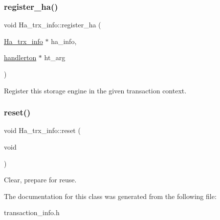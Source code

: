 \subsubsection{\texorpdfstring{register\+\_\+ha()}{register\_ha()}}
{\footnotesize\ttfamily void Ha\+\_\+trx\+\_\+info\+::register\+\_\+ha (\begin{DoxyParamCaption}\item[{\mbox{\hyperlink{classHa__trx__info}{Ha\+\_\+trx\+\_\+info}} $\ast$}]{ha\+\_\+info,  }\item[{\mbox{\hyperlink{structhandlerton}{handlerton}} $\ast$}]{ht\+\_\+arg }\end{DoxyParamCaption})\hspace{0.3cm}{\ttfamily [inline]}}

Register this storage engine in the given transaction context. \mbox{\label{classHa__trx__info_a8566510f1fa2e76f93fa7656b110cc4b}} 
\subsubsection{\texorpdfstring{reset()}{reset()}}
{\footnotesize\ttfamily void Ha\+\_\+trx\+\_\+info\+::reset (\begin{DoxyParamCaption}\item[{void}]{ }\end{DoxyParamCaption})\hspace{0.3cm}{\ttfamily [inline]}}

Clear, prepare for reuse. 

The documentation for this class was generated from the following file\+:\begin{DoxyCompactItemize}
\item 
transaction\+\_\+info.\+h\end{DoxyCompactItemize}
